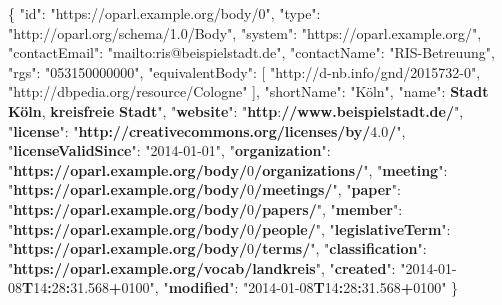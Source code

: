 \documentclass[,a4paper]{article}
\newenvironment{Shaded}{}{}
\newcommand{\DataTypeTok}[1]{\textcolor[rgb]{0.56,0.13,0.00}{{#1}}}
\newcommand{\DecValTok}[1]{\textcolor[rgb]{0.25,0.63,0.44}{{#1}}}
\newcommand{\FloatTok}[1]{\textcolor[rgb]{0.25,0.63,0.44}{{#1}}}
\newcommand{\StringTok}[1]{\textcolor[rgb]{0.25,0.44,0.63}{{#1}}}
\newcommand{\OtherTok}[1]{\textcolor[rgb]{0.00,0.44,0.13}{{#1}}}
\newcommand{\FunctionTok}[1]{\textcolor[rgb]{0.02,0.16,0.49}{{#1}}}
\newcommand{\ErrorTok}[1]{\textcolor[rgb]{1.00,0.00,0.00}{\textbf{{#1}}}}
\begin{document}
\begin{Shaded}
\begin{Highlighting}[]
\FunctionTok{\{}
    \DataTypeTok{"id"}\FunctionTok{:} \StringTok{"https://oparl.example.org/body/0"}\FunctionTok{,}
    \DataTypeTok{"type"}\FunctionTok{:} \StringTok{"http://oparl.org/schema/1.0/Body"}\FunctionTok{,}
    \DataTypeTok{"system"}\FunctionTok{:} \StringTok{"https://oparl.example.org/"}\FunctionTok{,}
    \DataTypeTok{"contactEmail"}\FunctionTok{:} \StringTok{"mailto:ris@beispielstadt.de"}\FunctionTok{,}
    \DataTypeTok{"contactName"}\FunctionTok{:} \StringTok{"RIS-Betreuung"}\FunctionTok{,}
    \DataTypeTok{"rgs"}\FunctionTok{:} \StringTok{"053150000000"}\FunctionTok{,}
    \DataTypeTok{"equivalentBody"}\FunctionTok{:} \OtherTok{[}
        \StringTok{"http://d-nb.info/gnd/2015732-0"}\OtherTok{,}
        \StringTok{"http://dbpedia.org/resource/Cologne"}
    \OtherTok{]}\FunctionTok{,}
    \DataTypeTok{"shortName"}\FunctionTok{:} \StringTok{"Köln"}\FunctionTok{,}
    \DataTypeTok{"name"}\FunctionTok{:} \ErrorTok{Stadt} \ErrorTok{Köln}\FunctionTok{,} \ErrorTok{kreisfreie} \ErrorTok{Stadt}\DataTypeTok{",}
\DataTypeTok{    "}\ErrorTok{website}\DataTypeTok{": "}\ErrorTok{http}\FunctionTok{:}\ErrorTok{//www.beispielstadt.de/}\StringTok{",}
\StringTok{    "}\ErrorTok{license}\StringTok{": "}\ErrorTok{http://creativecommons.org/licenses/by/}\FloatTok{4.0}\ErrorTok{/}\StringTok{",}
\StringTok{    "}\ErrorTok{licenseValidSince}\StringTok{": "}\DecValTok{2014-01-01}\StringTok{",}
\StringTok{    "}\ErrorTok{organization}\StringTok{": "}\ErrorTok{https://oparl.example.org/body/}\DecValTok{0}\ErrorTok{/organizations/}\StringTok{",}
\StringTok{    "}\ErrorTok{meeting}\StringTok{": "}\ErrorTok{https://oparl.example.org/body/}\DecValTok{0}\ErrorTok{/meetings/}\StringTok{",}
\StringTok{    "}\ErrorTok{paper}\StringTok{": "}\ErrorTok{https://oparl.example.org/body/}\DecValTok{0}\ErrorTok{/papers/}\StringTok{",}
\StringTok{    "}\ErrorTok{member}\StringTok{": "}\ErrorTok{https://oparl.example.org/body/}\DecValTok{0}\ErrorTok{/people/}\StringTok{",}
\StringTok{    "}\ErrorTok{legislativeTerm}\StringTok{": "}\ErrorTok{https://oparl.example.org/body/}\DecValTok{0}\ErrorTok{/terms/}\StringTok{",}
\StringTok{    "}\ErrorTok{classification}\StringTok{": "}\ErrorTok{https://oparl.example.org/vocab/landkreis}\StringTok{",}
\StringTok{    "}\ErrorTok{created}\StringTok{": "}\DecValTok{2014-01-08}\ErrorTok{T}\DecValTok{14}\ErrorTok{:}\DecValTok{28}\ErrorTok{:}\FloatTok{31.568}\ErrorTok{+}\DecValTok{0100}\StringTok{",}
\StringTok{    "}\ErrorTok{modified}\StringTok{": "}\DecValTok{2014-01-08}\ErrorTok{T}\DecValTok{14}\ErrorTok{:}\DecValTok{28}\ErrorTok{:}\FloatTok{31.568}\ErrorTok{+}\DecValTok{0100}\StringTok{"}
\StringTok{\}}
\end{Highlighting}
\end{Shaded}
\end{document}
